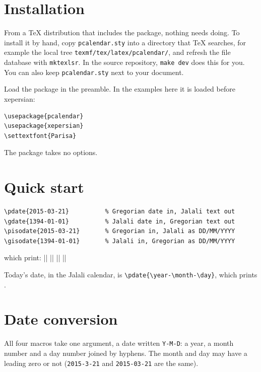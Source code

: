 \documentclass[11pt]{article}
\newcommand\iso[1]{\lr{#1}}            %
\newcommand\pkg[1]{\textsf{#1}}
\newcommand\cs[1]{\texttt{\textbackslash #1}}
\newcommand\gap{\par\smallskip}
\begin{document}
\section{Installation}\label{sec:installation2}

From a TeX distribution that includes the package, nothing needs doing. To install it by hand, copy
\texttt{pcalendar.sty} into a directory that TeX searches, for example the local tree
\texttt{texmf/tex/latex/pcalendar/}, and refresh the file database with \texttt{mktexlsr}. In the
source repository, \texttt{make dev} does this for you. You can also keep \texttt{pcalendar.sty}
next to your document.

Load the package in the preamble. In the examples here it is loaded before \pkg{xepersian}:
\begin{verbatim}
\usepackage{pcalendar}
\usepackage{xepersian}
\settextfont{Parisa}
\end{verbatim}
The package takes no options.

\section{Quick start}\label{sec:quick3}

\begin{verbatim}
\pdate{2015-03-21}          % Gregorian date in, Jalali text out
\gdate{1394-01-01}          % Jalali date in, Gregorian text out
\pisodate{2015-03-21}       % Gregorian in, Jalali as DD/MM/YYYY
\gisodate{1394-01-01}       % Jalali in, Gregorian as DD/MM/YYYY
\end{verbatim}
which print:
\ex||{}
\ex||{}
\ex||{\iso{\pisodate{2015-03-21}}}
\ex||{\iso{\gisodate{1394-01-01}}}
\gap
Today's date, in the Jalali calendar, is \cs{pdate}\texttt{\{\cs{year}-\cs{month}-\cs{day}\}}, which
prints \pdate{\year-\month-\day}.

\section{Date conversion}\label{sec:date4}

All four macros take one argument, a date written \texttt{Y-M-D}: a year, a month number and a day
number joined by hyphens. The month and day may have a leading zero or not
(\texttt{2015-3-21} and \texttt{2015-03-21} are the same).
\end{document}
